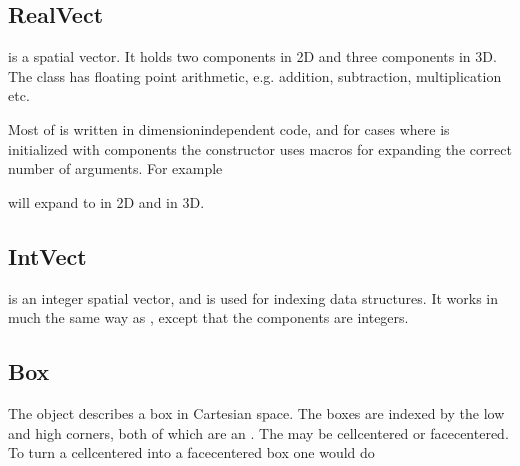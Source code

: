 \documentclass[letterpaper,10pt,english]{sphinxmanual}
\begin{document}
\subsection{RealVect}
\label{\detokenize{Source/ChomboBasics:realvect}}
 is a spatial vector.
It holds two  components in 2D and three  components in 3D.
The  class has floating point arithmetic, e.g. addition, subtraction, multiplication etc.

Most of  is written in dimension\sphinxhyphen{}independent code, and for cases where  is initialized with components the constructor uses  macros for expanding the correct number of arguments.
For example

\begin{sphinxVerbatim}[commandchars=\\\{\},formatcom=\scriptsize]
   
\end{sphinxVerbatim}

will expand to  in 2D and  in 3D.


\subsection{IntVect}
\label{\detokenize{Source/ChomboBasics:intvect}}
 is an integer spatial vector, and is used for indexing data structures.
It works in much the same way as , except that the components are integers.


\subsection{Box}
\label{\detokenize{Source/ChomboBasics:box}}
The  object describes a box in Cartesian space.
The boxes are indexed by the low and high corners, both of which are an .
The  may be cell\sphinxhyphen{}centered or face\sphinxhyphen{}centered.
To turn a cell\sphinxhyphen{}centered  into a face\sphinxhyphen{}centered box one would do
\end{document}
